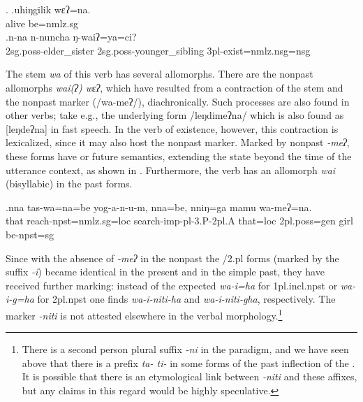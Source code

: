 \ex. \ag.uhiŋgilik wɛʔ=na.\\
alive be{\sc [npst;3sg]=nmlz.sg}\\ 
\bg.n-na n-nuncha ŋ-waiʔ=ya=ci?\\
{\sc 2sg.poss-}elder\_sister  {\sc 2sg.poss-}younger\_sibling {\sc 3pl-}exist{\sc [npst]=nmlz.nsg=nsg}\\


The stem \emph{wa} of this verb has several allomorphs. There are the nonpast allomorphs \emph{wai(ʔ) \ti wɛʔ}, which have resulted from a contraction of the stem and the nonpast marker (/wa-meʔ/), diachronically. Such processes are also found in other verbs; take e.g., the underlying form /leŋdimeʔna/ which is also found as [leŋdeʔna] in fast speech. In the verb of existence, however, this contraction is lexicalized, since it may also host the nonpast marker. Marked by nonpast \emph{-meʔ}, these forms have  or future semantics, extending the state beyond the time of the utterance context, as shown in \Next. Furthermore, the verb has an allomorph \emph{wai} (bisyllabic) in the past forms. 

\exg.nna  tas-wa=na=be  yog-a-n-u-m,      nna=be,    nniŋ=ga       mamu wa-meʔ=na.\\
that reach{\sc -npst=nmlz.sg=loc} search{\sc -imp-pl-3.P-2pl.A} that{\sc =loc} {\sc 2pl.poss=gen} girl be{\sc [3sg]-npst=sg}\\
 


Since with the absence of \emph{-meʔ} in the nonpast the {/2.pl} forms (marked by the suffix \emph{-i}) became identical in the present and in the simple past, they have received further marking: instead of the expected \emph{wa-i=ha} for {\sc 1pl.incl.npst} or \emph{wa-i-g=ha} for {\sc 2pl.npst} one finds \emph{wa-i-niti-ha} and \emph{wa-i-niti-gha}, respectively. The marker \emph{-niti} is not attested elsewhere in the verbal morphology.\footnote{There is a second person plural suffix \emph{-ni} in the  paradigm, and we have seen above that there is a prefix \emph{ta- \ti ti-} in some forms of the past inflection of the . It is possible that there is an etymological link between \emph{-niti} and these affixes, but any claims in this regard would be highly speculative.}

